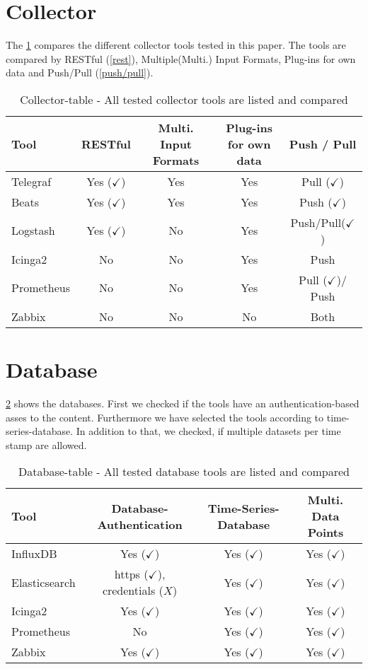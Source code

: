 \section{Collector}
The \cref{tab:Collector} compares the different collector tools tested in this paper. The tools are compared by RESTful (\cref{rest}), Multiple(Multi.) Input Formats, Plug-ins for own data and Push/Pull (\cref{push/pull}).
\begin{table}[H]
\centering
\begin{tabular}{lcccc}
\hline

Tool & RESTful & Multi. Input Formats      & Plug-ins for own data        & Push / Pull \\

\hline
Telegraf    & Yes ($ \checkmark $) & Yes    & Yes    &Pull    ($ \checkmark $)  \\
Beats  & Yes ($ \checkmark $)  & Yes & Yes  & Push ($ \checkmark $) \\
Logstash & Yes ($ \checkmark $)  & No & Yes & Push/Pull($\checkmark$)                         \\
Icinga2  & No  & No  & Yes  & Push \\
Prometheus  & No  & No  & Yes  & Pull ($ \checkmark $)/ Push\\
Zabbix & No  & No  & No  & Both \\
\hline                        
\end{tabular}
\caption{Collector-table - All tested collector tools are listed and compared}
\label{tab:Collector}
\end{table}

\section{Database}
\cref{tab:Database} shows the databases. First we checked if the tools have an authentication-based asses to  the content. Furthermore we have selected the tools according to time-series-database. In addition to that, we checked, if multiple datasets per time stamp are allowed. 
\begin{table}[H]
\centering
\begin{tabular}{lccc}
	\hline
Tool & Database-Authentication     & Time-Series-Database          & Multi. Data Points        \\
\hline
InfluxDB  & Yes ($ \checkmark $) & Yes ($ \checkmark $)  & Yes ($ \checkmark $)\\
Elasticsearch & https ($ \checkmark $), credentials ($ X $) & Yes ($ \checkmark $) & Yes ($ \checkmark $)\\
Icinga2 & Yes ($ \checkmark $) & Yes ($ \checkmark $) & Yes ($ \checkmark $) \\
Prometheus& No & Yes ($ \checkmark $) & Yes ($ \checkmark $)\\
Zabbix& Yes ($ \checkmark $) & Yes ($ \checkmark $) & Yes ($ \checkmark $)\\
\hline
\end{tabular}
\caption{Database-table - All tested database tools are listed and compared}
\label{tab:Database}
\end{table}

